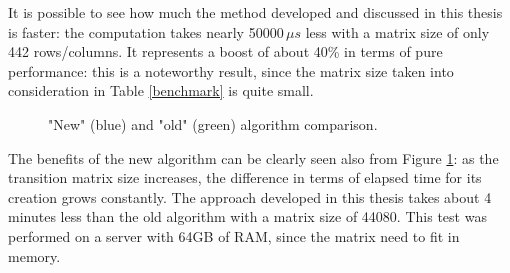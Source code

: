 It is possible to see how much the method developed and discussed in this thesis is faster: the computation takes nearly 50000\(\,\mu{s} \) less with a matrix size of only 442 rows/columns. It represents a boost of about 40\% in terms of pure performance: this is a noteworthy result, since the matrix size taken into consideration in Table \ref{benchmark} is quite small.\\

\begin{figure}[H]
  \caption[]{"New" (blue) and "old" (green) algorithm comparison\footnotemark[3].}
  \label{performancechart}
\end{figure}


The benefits of the new algorithm can be clearly seen also from Figure \ref{performancechart}: as the transition matrix size increases, the difference in terms of elapsed time for its creation grows constantly. The approach developed in this thesis takes about 4 minutes less than the old algorithm with a matrix size of 44080. This test was performed on a server with 64GB of RAM, since the matrix need to fit in memory.